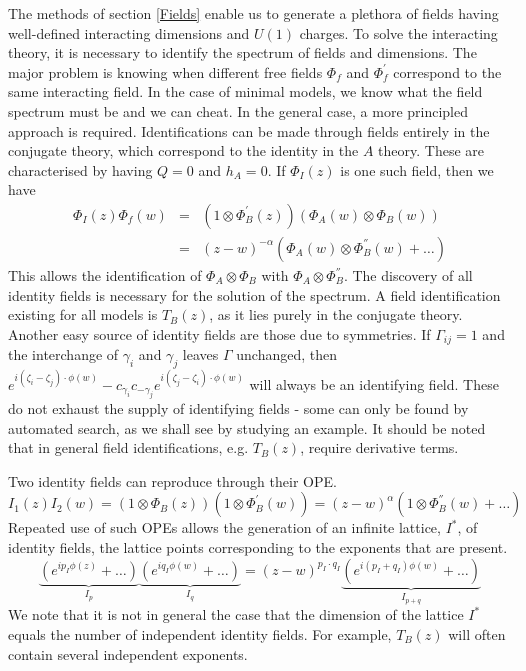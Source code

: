 \documentclass[a4paper,a4paper]{article}
\begin{document}
The methods of section \ref{Fields} enable us to generate a plethora of fields having 
well-defined interacting dimensions and $U(1)$ charges. 
To solve the interacting theory, it is necessary to identify the spectrum
of fields and dimensions. The major problem is knowing when different free fields $\Phi_f$ and $\Phi_f^{'}$ correspond to the 
same interacting field.
In the case of minimal models, we know what the field spectrum must be and we can cheat. 
In the general case, a more principled approach is required.
Identifications can be made through fields entirely in the conjugate theory, which correspond to the identity in the 
$A$ theory. These are characterised by having $Q=0$ and $h_A=0$. If $\Phi_I(z)$ is one such field, then we have
\begin{eqnarray}
\Phi_I(z) \Phi_f(w) & = & (1 \otimes \Phi^{'}_B(z))(\Phi_A(w)\otimes\Phi_B(w)) \nonumber\\
& = & (z-w)^{-\alpha}(\Phi_A(w)\otimes \Phi_B^{''}(w) + \ldots ) \nonumber
\end{eqnarray}
This allows the identification of $\Phi_A \otimes \Phi_B$ with $\Phi_A \otimes \Phi_B^{''}$.
The discovery of all identity fields
is necessary for the solution of the spectrum.
A field identification existing for all models is $T_B(z)$, as it lies purely in the conjugate theory. Another easy source
of identity fields are those due to symmetries. If $\Gamma_{ij}=1$ and the interchange of $\gamma_i$ and $\gamma_j$ leaves $\Gamma$ unchanged,
then $e^{i(\zeta_i - \zeta_j)\cdot\phi(w)} - c_{\gamma_i}c_{-\gamma_j}e^{i(\zeta_j - \zeta_i)\cdot\phi(w)}$ will always be an identifying field. These
do not exhaust the supply of identifying fields - some can only be found by automated search,
as we shall see by studying an example. It should be noted that in general field identifications, e.g. $T_B(z)$, require derivative terms.

Two identity fields can reproduce through their OPE.
\begin{displaymath}
I_1(z)I_2(w) = (1\otimes \Phi_B(z))(1 \otimes \Phi_B^{'}(w)) = (z-w)^{\alpha}(1 \otimes \Phi_B^{''}(w) + \ldots )
\end{displaymath}
Repeated use of such OPEs allows the generation of an infinite lattice, $I^{*}$, of identity fields, the lattice points
corresponding to the exponents that are present. 
\begin{displaymath}
\underbrace{(e^{ip_I\phi(z)} + \ldots)}_{I_p}\underbrace{(e^{iq_I\phi(w)} + \ldots )}_{I_q} = 
(z-w)^{p_I \cdot q_I}\underbrace{(e^{i(p_I + q_I)\phi(w)} + \dots )}_{I_{p+q}}
\end{displaymath}
We note that it is not in general the case
that the dimension of the lattice $I^{*}$ equals the number of independent identity fields. For example, $T_B(z)$ will
often contain several independent exponents. 
\end{document}
